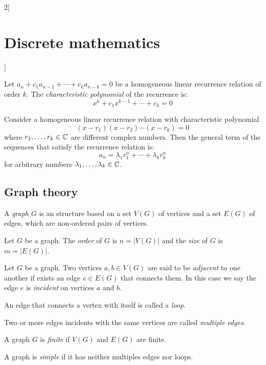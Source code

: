\documentclass[../../../main.tex]{subfiles}
\begin{document}
\begin{multicols}{2}[\section{Discrete mathematics}]
  \begin{definition}
    Let $a_n+c_1a_{n-1}+\cdots+c_ka_{n-k}=0$ be a homogeneous linear recurrence relation of order $k$. The \emph{characteristic polynomial} of the recurrence is: $$x^k+c_1x^{k-1}+\cdots+c_k=0$$
  \end{definition}
  \begin{prop}
    Consider a homogeneous linear recurrence relation with characteristic polynomial $$(x-r_1)(x-r_2)\cdots(x-r_k)=0$$ where $r_1,\ldots,r_k\in\mathbb{C} $ are different complex numbers. Then the general term of the sequences that satisfy the recurrence relation is: $$a_n=\lambda_1r_1^n+\cdots+\lambda_kr_k^n$$ for arbitrary numbers $\lambda_1,\ldots,\lambda_k\in\mathbb{C} $.
  \end{prop}
  \subsection{Graph theory}
  \begin{definition}
    A \emph{graph} $G$ is an structure based on a set $V(G)$ of vertices and a set $E(G)$ of edges, which are non-ordered pairs of vertices.
  \end{definition}
  \begin{definition}
    Let $G$ be a graph. The \emph{order} of $G$ is $n=|V(G)|$ and the \emph{size} of $G$ is $m=|E(G)|$.
  \end{definition}
  \begin{definition}
    Let $G$ be a graph. Two vertices $a,b\in V(G)$ are said to be \emph{adjacent} to one another if exists an edge $e\in E(G)$ that connects them. In this case we say the edge $e$ is \emph{incident} on vertices $a$ and $b$.
  \end{definition}
  \begin{definition}
    An edge that connects a vertex with itself is called a \emph{loop}.
  \end{definition}
  \begin{definition}
    Two or more edges incidents with the same vertices are called \emph{multiple edges}.
  \end{definition}
  \begin{definition}
    A graph $G$ is \emph{finite} if $V(G)$ and $E(G)$ are finite.
  \end{definition}
  \begin{definition}
    A graph is \emph{simple} if it has neither multiples edges nor loops.
  \end{definition}
  \begin{definition}

\end{definition}
\end{multicols}
\end{document}
